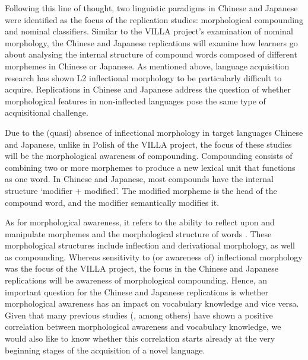 \documentclass[output=paper,colorlinks,citecolor=brown,modfonts,nonflat]{../langscibook}
\begin{document}
Following this line of thought, two linguistic paradigms in Chinese and Japanese were identified as the focus of the replication studies: morphological compounding and nominal classifiers. Similar to the VILLA project’s examination of nominal morphology, the Chinese and Japanese replications will examine how learners go about analysing the internal structure of compound words composed of different morphemes in Chinese or Japanese. As mentioned above, language acquisition research has shown L2 inflectional morphology to be particularly difficult to acquire. Replications in Chinese and Japanese address the question of whether morphological features in non-inflected languages pose the same type of acquisitional challenge.

Due to the (quasi) absence of inflectional morphology in target languages Chinese and Japanese, unlike in Polish of the VILLA project, the focus of these studies will be the morphological awareness of compounding. Compounding consists of combining two or more morphemes to produce a new lexical unit that functions as one word. In Chinese and Japanese, most compounds have the internal structure ‘modifier + modified’. The modified morpheme is the head of the compound word, and the modifier semantically modifies it.

As for morphological awareness, it refers to the ability to reflect upon and manipulate morphemes and the morphological structure of words \citep{Carlisle2003}. These morphological structures include inflection and derivational morphology, as well as compounding. Whereas sensitivity to (or awareness of) inflectional morphology was the focus of the VILLA project, the focus in the Chinese and Japanese replications will be awareness of morphological compounding. Hence, an important question for the Chinese and Japanese replications is whether morphological awareness has an impact on vocabulary knowledge and vice versa. Given that many previous studies (\citealt{KuAnderson2003,ZhangKoda2014,Ichikawa2014,ZhangEtAl2016}, among others) have shown a positive correlation between morphological awareness and vocabulary knowledge, we would also like to know whether this correlation starts already at the very beginning stages of the acquisition of a novel language.
\end{document}
